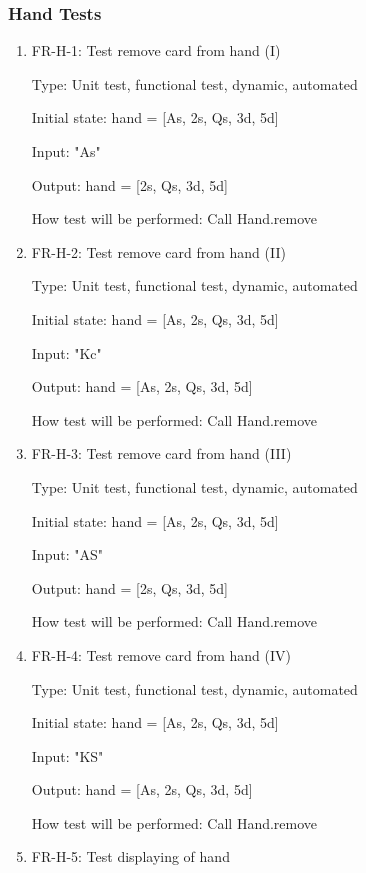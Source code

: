\documentclass[12pt, titlepage]{article}
\begin{document}
\subsubsection{Hand Tests}
\begin{enumerate}
    \item{FR-H-1: Test remove card from hand (I)}
    
    Type: Unit test, functional test, dynamic, automated 
    					
    Initial state: hand = [As, 2s, Qs, 3d, 5d]
    
    Input: "As"
    
    Output: hand = [2s, Qs, 3d, 5d]
    
    How test will be performed: Call Hand.remove 
    
    \item{FR-H-2: Test remove card from hand (II)}
    
    Type: Unit test, functional test, dynamic, automated 
    					
    Initial state: hand = [As, 2s, Qs, 3d, 5d]
    
    Input: "Kc"
    
    Output: hand = [As, 2s, Qs, 3d, 5d]
    
    How test will be performed: Call Hand.remove
    
    \item{FR-H-3: Test remove card from hand (III)}
    
    Type: Unit test, functional test, dynamic, automated 
    					
    Initial state: hand = [As, 2s, Qs, 3d, 5d]
    
    Input: "AS"
    
    Output: hand = [2s, Qs, 3d, 5d]
    
    How test will be performed: Call Hand.remove
    
    \item{FR-H-4: Test remove card from hand (IV)}
    
    Type: Unit test, functional test, dynamic, automated
    
    Initial state: hand = [As, 2s, Qs, 3d, 5d]
    
    Input: "KS"
    
    Output: hand = [As, 2s, Qs, 3d, 5d]
    
    How test will be performed: Call Hand.remove
    
    \item{FR-H-5: Test displaying of hand}
    

\end{enumerate}
\end{document}
